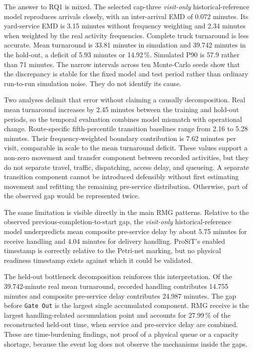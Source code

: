 The answer to RQ1 is mixed. The selected cap-three \textit{visit-only}
historical-reference model
reproduces arrivals closely, with an inter-arrival EMD of 0.072 minutes. Its
yard-service EMD is 3.15 minutes without frequency weighting and 2.34 minutes
when weighted by the real activity frequencies. Complete truck turnaround is
less accurate. Mean turnaround is 33.81 minutes in simulation and 39.742
minutes in the hold-out, a deficit of 5.93 minutes or 14.92\,\%. Simulated P90
is 57.9 rather than 71 minutes. The narrow intervals across ten
Monte-Carlo seeds show that the discrepancy is stable for the fixed model and
test period rather than ordinary run-to-run simulation noise. They do not
identify its cause.

Two analyses delimit that error without claiming a causally decomposition. Real
mean turnaround increases by 2.45 minutes between the training and hold-out
periods, so the temporal evaluation combines model mismatch with operational
change. Route-specific fifth-percentile transition baselines range from 2.16
to 5.28 minutes. Their frequency-weighted boundary contribution is 7.62
minutes per visit, comparable in scale to the mean turnaround deficit. These values
support a non-zero movement and transfer component between recorded
activities, but they do not separate travel, traffic, dispatching, access
delay, and queueing. A separate transition component cannot be introduced
defensibly without first estimating movement and refitting the remaining
pre-service distribution. Otherwise, part of the observed gap would be
represented twice.

The same limitation is visible directly in the main RMG patterns. Relative to
the observed previous-completion-to-start gap, the \textit{visit-only}
historical-reference model underpredicts
mean composite pre-service delay by about 5.75 minutes for receive handling and
4.04 minutes for delivery handling. ProSiT's enabled timestamp is correctly
relative to the Petri-net marking, but no physical readiness timestamp exists
against which it could be validated.

The held-out bottleneck decomposition reinforces this interpretation. Of the
39.742-minute real mean turnaround, recorded handling contributes 14.755
minutes and composite pre-service delay contributes 24.987 minutes. The gap
before \texttt{Gate Out} is the largest single accumulated component. RMG
receive is the largest handling-related accumulation point and accounts for
27.99\,\% of the reconstructed held-out time, when service and pre-service delay are
combined. These are time-burdening findings, not proof of a physical queue or a
capacity shortage, because the event log does not observe the mechanisms
inside the gaps.

